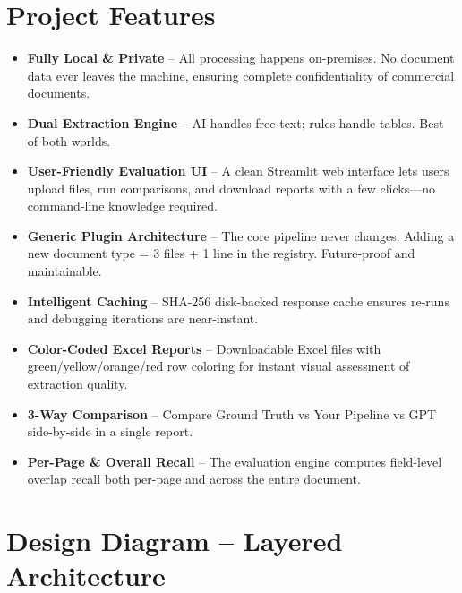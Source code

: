 \documentclass[12pt,a4paper]{report}
\begin{document}
\section{Project Features}

\begin{itemize}[nosep]
    \item \textbf{Fully Local \& Private} -- All processing happens on-premises. No document data ever leaves the machine, ensuring complete confidentiality of commercial documents.
    \item \textbf{Dual Extraction Engine} -- AI handles free-text; rules handle tables. Best of both worlds.
    \item \textbf{User-Friendly Evaluation UI} -- A clean Streamlit web interface lets users upload files, run comparisons, and download reports with a few clicks---no command-line knowledge required.
    \item \textbf{Generic Plugin Architecture} -- The core pipeline never changes. Adding a new document type = 3 files + 1 line in the registry. Future-proof and maintainable.
    \item \textbf{Intelligent Caching} -- SHA-256 disk-backed response cache ensures re-runs and debugging iterations are near-instant.
    \item \textbf{Color-Coded Excel Reports} -- Downloadable Excel files with green/yellow/orange/red row coloring for instant visual assessment of extraction quality.
    \item \textbf{3-Way Comparison} -- Compare Ground Truth vs Your Pipeline vs GPT side-by-side in a single report.
    \item \textbf{Per-Page \& Overall Recall} -- The evaluation engine computes field-level overlap recall both per-page and across the entire document.
\end{itemize}

\section{Design Diagram -- Layered Architecture}
\end{document}
